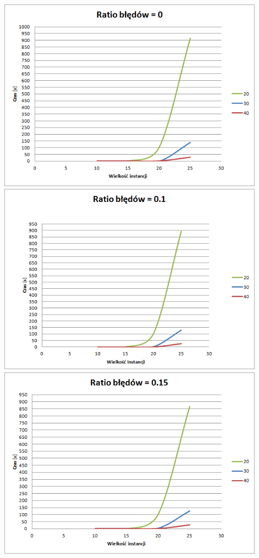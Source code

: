\documentclass{article}
\begin{document}
\begin{center}

\includegraphics[scale=0.75]{0}
\includegraphics[scale=0.75]{0-1}
\includegraphics[scale=0.75]{0-15}

\end{center}
\end{document}
